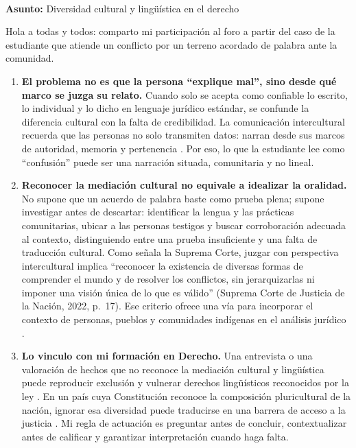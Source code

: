 \documentclass[
  spanish,
  letterpaper, oneside
]{article}
\newcommand{\foroCopyButton}[1]{%
  \textattachfile[appearance={},description={Participacion del foro (texto copiable)},mimetype=text/plain]{#1}{%
    \colorbox{unadmGreen}{\small\textcolor{white}{\,Copiar participación\,}}%
  }%
}
\begin{document}
\begin{forobox}[title={Participación publicada en el foro}]
\hfill\foroCopyButton{foro-participacion-Actividad-2.txt}\\[-0.5em]
\label{foro-participacion}

\textbf{Asunto:} Diversidad cultural y lingüística en el derecho\par
\medskip
Hola a todas y todos: comparto mi participación al foro a partir del caso de la estudiante que atiende un conflicto por un terreno acordado de palabra ante la comunidad.
\medskip

\begin{enumerate}[leftmargin=1.6em,labelsep=0.6em,itemsep=0.5em,label=\textbf{\arabic*)}]
  \item \textbf{El problema no es que la persona ``explique mal'', sino desde qué marco se juzga su relato.} Cuando solo se acepta como confiable lo escrito, lo individual y lo dicho en lenguaje jurídico estándar, se confunde la diferencia cultural con la falta de credibilidad. La comunicación intercultural recuerda que las personas no solo transmiten datos: narran desde sus marcos de autoridad, memoria y pertenencia \citep{pech2016manual}. Por eso, lo que la estudiante lee como ``confusión'' puede ser una narración situada, comunitaria y no lineal.

  \item \textbf{Reconocer la mediación cultural no equivale a idealizar la oralidad.} No supone que un acuerdo de palabra baste como prueba plena; supone investigar antes de descartar: identificar la lengua y las prácticas comunitarias, ubicar a las personas testigos y buscar corroboración adecuada al contexto, distinguiendo entre una prueba insuficiente y una falta de traducción cultural. Como señala la Suprema Corte, juzgar con perspectiva intercultural implica ``reconocer la existencia de diversas formas de comprender el mundo y de resolver los conflictos, sin jerarquizarlas ni imponer una visión única de lo que es válido'' (Suprema Corte de Justicia de la Nación, 2022, p.~17). Ese criterio ofrece una vía para incorporar el contexto de personas, pueblos y comunidades indígenas en el análisis jurídico \citep{scjn2022protocolo}.

  \item \textbf{Lo vinculo con mi formación en Derecho.} Una entrevista o una valoración de hechos que no reconoce la mediación cultural y lingüística puede reproducir exclusión y vulnerar derechos lingüísticos reconocidos por la ley \citep{leyDerechosLinguisticos2024}. En un país cuya Constitución reconoce la composición pluricultural de la nación, ignorar esa diversidad puede traducirse en una barrera de acceso a la justicia \citep{cpeum2026}. Mi regla de actuación es preguntar antes de concluir, contextualizar antes de calificar y garantizar interpretación cuando haga falta.
\end{enumerate}
\medskip


\end{forobox}
\end{document}

